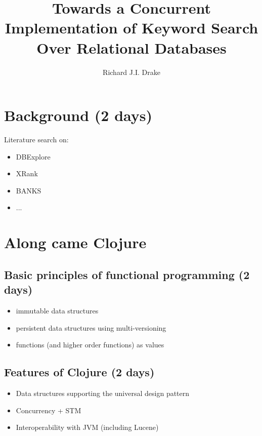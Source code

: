 \documentclass[grad]{uoit-thesis}
\author{Richard J.I. Drake}
\title{Towards a Concurrent Implementation of Keyword Search Over Relational Databases}
\begin{document}
	\begin{preliminary}
		\maketitle

		\setcounter{page}{3}

		\tableofcontents

		\listoftables
		\listoffigures
		\listofalgorithms
		\printnomenclature
	\end{preliminary}
	
	\chapter{Background (2 days)}
		Literature search on:

		\begin{itemize}
			\item DBExplore
			\item XRank
			\item BANKS
			\item ...
		\end{itemize}
	
	
	
	\chapter{Along came Clojure}
		\section{Basic principles of functional programming (2 days)}
			\begin{itemize}
				\item immutable data structures
				\item persistent data structures using multi-versioning
				\item functions (and higher order functions) as values
			\end{itemize}
		
		\section{Features of Clojure (2 days)}
			\begin{itemize}
				\item Data structures supporting the universal design pattern
				\item Concurrency + STM
				\item Interoperability with JVM (including Lucene)
			\end{itemize}
\end{document}
